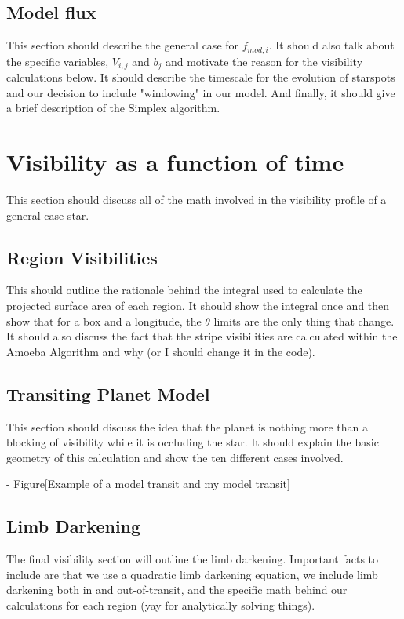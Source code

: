 \documentclass[iop]{emulateapj}
\newcommand{\fmod}{\mbox{$f_{mod,i}$}}
\begin{document}
\subsection{Model flux}
	This section should describe the general case for \fmod. It should also talk about the specific variables, $V_{i,j}$ and $b_j$ and motivate the reason for the visibility calculations below. It should describe the timescale for the evolution of starspots and our decision to include "windowing" in our model. And finally, it should give a brief description of the Simplex algorithm.
	
\section{Visibility as a function of time}
	This section should discuss all of the math involved in the visibility profile of a general case star.
\subsection{Region Visibilities}
	This should outline the rationale behind the integral used to calculate the projected surface area of each region. It should show the integral once and then show that for a box and a longitude, the $\theta$ limits are the only thing that change. It should also discuss the fact that the stripe visibilities are calculated within the Amoeba Algorithm and why (or I should change it in the code).
	
\subsection{Transiting Planet Model}
	This section should discuss the idea that the planet is nothing more than a blocking of visibility while it is occluding the star. It should explain the basic geometry of this calculation and show the ten different cases involved.
	
	 - Figure[Example of a model transit and my model transit]
\subsection{Limb Darkening}
	The final visibility section will outline the limb darkening. Important facts to include are that we use a quadratic limb darkening equation, we include limb darkening both in and out-of-transit, and the specific math behind our calculations for each region (yay for analytically solving things).
\end{document}
